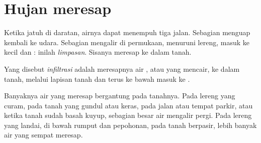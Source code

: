 \section{Hujan meresap}

Ketika  jatuh di daratan, airnya dapat menempuh tiga jalan. Sebagian
menguap kembali ke udara. Sebagian mengalir di permukaan, menuruni lereng,
masuk ke  kecil dan : inilah \emph{limpasan}. Sisanya
meresap ke dalam tanah.

\begin{definition}[Infiltrasi]\label{def:g6:water-underground:infiltration}
Yang disebut \emph{infiltrasi} adalah meresapnya air ,
atau  yang mencair, ke dalam tanah, melalui lapisan tanah dan terus ke
bawah masuk ke .
\end{definition}

Banyaknya air yang meresap bergantung pada tanahnya. Pada lereng yang
curam, pada tanah yang gundul atau keras, pada jalan atau tempat parkir,
atau ketika tanah sudah basah kuyup, sebagian besar air mengalir pergi. Pada
lereng yang landai, di bawah rumput dan pepohonan, pada tanah berpasir,
lebih banyak air yang sempat meresap.

